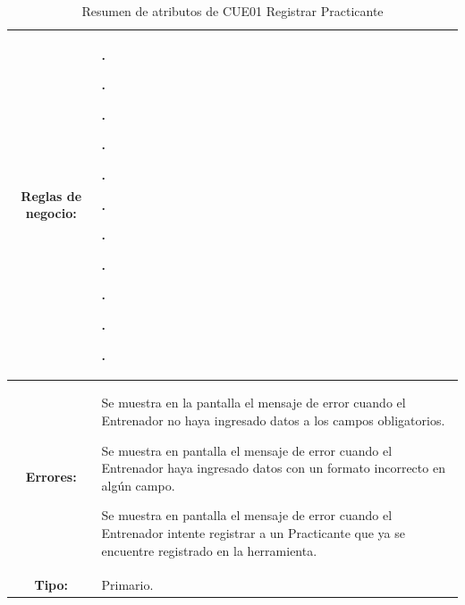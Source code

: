 \begin{table}[H]
\centering
\begin{tabular}{| c | p{12 cm} |}
\hline
\textbf{Reglas de negocio:} & \vspace{-2mm}	%
							\begin{compactitem}
								\item \nameref{rn:RNR01}.
								\item \nameref{rn:RNR02}.
								\item \nameref{rn:RNR03}.
								\item \nameref{rn:RNR04}.
								\item \nameref{rn:RNR05}.
								\item \nameref{rn:RNR06}.
								\item \nameref{rn:RNR07}.
								\item \nameref{rn:RNR08}.
								\item \nameref{rn:RNR10}.
								\item \nameref{rn:RNR11}.
								\item \nameref{rn:RNR13}.
							\end{compactitem}\\		
\hline

\textbf{Errores:} & \vspace{-2mm}	%
					\begin{compactitem}
						\setlength\itemsep{-0.25em}
						\item Se muestra en la pantalla \nameref{pant:IUE01} el mensaje de error \nameref{msj:MSG12} cuando el Entrenador no haya ingresado datos a los campos obligatorios.
						\item Se muestra en pantalla el mensaje de error \nameref{msj:MSG13} cuando el Entrenador haya ingresado datos con un formato incorrecto en algún campo.
						\item Se muestra en pantalla el mensaje de error \nameref{msj:MSG11} cuando el Entrenador intente registrar a un Practicante que ya se encuentre registrado en la herramienta.
					\end{compactitem}\\
\hline
\textbf{Tipo:} & Primario.\\
\hline	
\end{tabular}
\caption{Resumen de atributos de CUE01 Registrar Practicante}
\label{tab:CUE01}
\end{table} 

